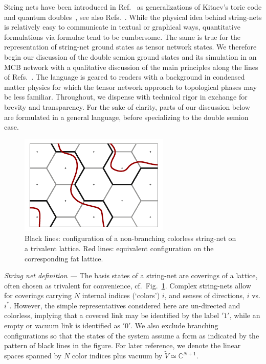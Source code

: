 \documentclass[twocolumn,floats,prx,showpacs]{revtex4-1}
\begin{document}
String nets have been introduced in Ref.~\cite{Levin2005} as generalizations of Kitaev's toric code and quantum doubles~\cite{Kitaev}, see also Refs.~\cite{Fidkowski2009,Bonesteel2012,Wen2017,Fendley2013}. While the physical idea behind string-nets is relatively easy to communicate in textual or graphical ways,  quantitative formulations via formulae tend to be cumbersome. The same is true for the representation of string-net ground states as tensor network states. We therefore begin our discussion of the double semion ground states and its simulation in an MCB network with a qualitative discussion of the main principles along the lines of Refs.\ \cite{Buerschaper2009,Gu2009}. 
The language is geared to readers with a background in condensed matter physics for which the tensor network approach to topological phases may be less familiar. 
Throughout, we dispense with technical rigor in exchange for brevity and transparency. For the sake of clarity,  parts of our discussion below are formulated in a general language, before specializing to the double semion case. 


\begin{figure}
\includegraphics[width=0.7\columnwidth]{fig/TrivalentLattice.pdf}
\caption{Black  lines: configuration of a non-branching colorless string-net on a trivalent lattice. Red lines: equivalent configuration on the corresponding fat lattice. }
\label{fig:TrivalentLattice}
\end{figure}


\emph{String net definition ---} The basis states of a string-net are coverings of a lattice, often chosen as trivalent for convenience, cf.~Fig.~\ref{fig:TrivalentLattice}. Complex string-nets allow for coverings carrying $N$ internal indices (`colors') $i$,  and senses of directions, $i$ vs. $i^\ast$. However, the simple representatives considered here are un-directed and colorless, implying that a covered link may be identified by the label $'1'$, while an empty or vacuum link is identified as $'0'$. We also exclude branching configurations so that the states of the system assume a form as indicated by the pattern of black lines in the figure. For later reference, we denote the linear spaces spanned by $N$ color indices plus vacuum by $\tilde V\simeq \mathbb{C}^{N+1}$.
\end{document}
